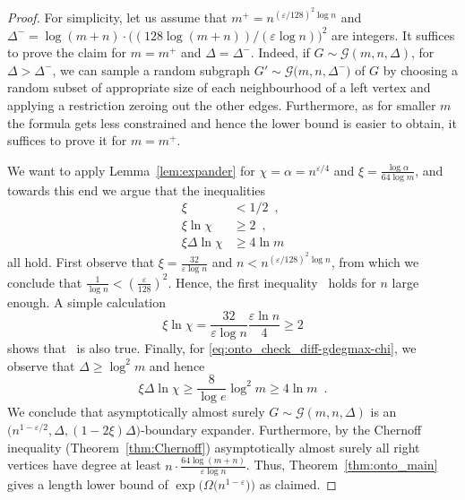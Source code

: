 \documentclass{article}
\newcommand{\eqperiod}{\enspace .}
\newcommand{\eqcomma}{\enspace ,}
\newcommand{\refthm}[1]{Theorem~\ref{#1}}
\newcommand{\reflem}[1]{Lemma~\ref{#1}}
\newcommand{\diff}{\xi}
\newcommand{\ontocdiff}{64}
\newcommand{\GdegMax}{\Delta}
\newcommand{\gdegmax}{\GdegMax}
\newcommand{\Gdist}{\mathcal{G}}
\newcommand{\constonto}{128}
\newcommand{\exponentalpha}{\varepsilon}
\numberwithin{equation}{section}
\begin{document}
{
\begin{proof}
  For simplicity, let us assume that $m^{+} = n^{\left( \exponentalpha/\constonto \right)^2 \log n}$
  and $\gdegmax^{-} = \log (m + n) \cdot \bigl( ( \constonto \log (m + n))/
  (\exponentalpha \log n) \bigr)^2$ are
  integers.
  It suffices to prove the claim for 
  $m = m^{+}$ and $\gdegmax = \gdegmax^{-}$.
  Indeed, if $G \sim \Gdist \left(m,n,\GdegMax \right)$,
  for 
  $\GdegMax > \gdegmax^{-} $,
  we can sample a random subgraph
  $G' \sim \Gdist 
  \bigl(m,n,\gdegmax^{-} \bigr)$ of $G$
  by choosing a random subset of appropriate size of each neighbourhood
  of a left vertex and applying a restriction zeroing out the other
  edges.
  Furthermore,
  as for smaller $m$ the formula gets less constrained
  and hence the lower bound is easier to obtain, it suffices to prove it for
  $m = m^{+}$.

  We want to apply \reflem{lem:expander} for 
  $\chi = \alpha = n^{\exponentalpha/4}$
  and
  $\diff = \frac{\log \alpha}{\ontocdiff \log m}$,
  and towards this end we argue that
  the inequalities
  \begin{subequations}
    \begin{align}
      \label{eq:onto_check_diff}
      \diff &< 1/2 \eqcomma \\
      \label{eq:onto_check_diff-chi}
      \diff \ln \chi &\geq 2 \eqcomma \\
      \label{eq:onto_check_diff-gdegmax-chi}
      \diff \gdegmax \ln \chi &\geq 4 \ln m
    \end{align}
  \end{subequations}
  all hold.
  First observe that
  $\diff = \frac{32}{\exponentalpha \log n}$
  and 
  $n < n^{\left(\exponentalpha/\constonto\right)^2 \log n}$,
  from which we conclude that
  $\frac{1}{\log n} < \left(\frac{\exponentalpha}{\constonto}\right)^2$. 
  Hence, the first inequality~
  holds for $n$ large enough.
  A simple calculation
  \begin{equation}
  \diff \ln \chi 
  =
  \frac
  { 32  }
  { \varepsilon \log n}
  \frac{\varepsilon \ln n}{4}
   \ge 2
  \end{equation}
  shows that~ is also true.
  Finally, for
  \eqref{eq:onto_check_diff-gdegmax-chi},
  we observe that $\gdegmax \ge \log^2 m$ and hence
  \begin{equation}
    \diff \gdegmax \ln \chi 
    \ge
    \frac{8}{\log e} \log^2 m
    \ge  4 \ln m  \eqperiod
  \end{equation}
  We conclude 
  that
  asymptotically almost surely
  $G \sim \Gdist \left(m,n,\GdegMax \right)$ is an
  $\bigl( n^{1 - \exponentalpha/2}, \GdegMax, (1 - 2 \diff)\GdegMax
  \bigr)$-boundary expander.  Furthermore, by the Chernoff inequality
  (\refthm{thm:Chernoff}) asymptotically almost surely all right
  vertices have degree at least
  $n \cdot \frac{64 \log (m + n)}{\exponentalpha\log n}$. Thus,
  \refthm{thm:onto_main} gives a length lower bound of
  $\exp\bigl( \Omega \bigl( n^{1 - \exponentalpha} \bigr) \bigr)$
  as claimed.
\end{proof}
}
\end{document}
